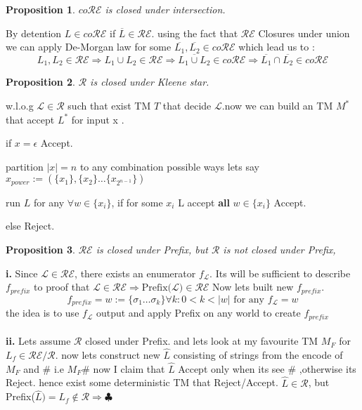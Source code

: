 \documentclass[12pt]{article}
\newtheorem{prop}{Proposition}
\begin{document}
\hrulefill
\begin{prop}  $co\mathcal{RE}$ is closed under intersection.\end{prop}
By detention $L \in co\mathcal{RE}$ if $\overline{L} \in \mathcal{RE}$. using the fact that $\mathcal{RE}$ Closures under union we can apply De-Morgan law  for some $\overline{ L_1},\overline{ L_2}\in co\mathcal{RE} $ which lead us to :  \[ L_1,L_2\in \mathcal{RE} \Rightarrow L_1\cup L_2\in \mathcal{RE}\Rightarrow \overline{ L_1\cup L_2}\in co\mathcal{RE}\Rightarrow \overline{ L_1} \cap \overline{ L_2}\in co\mathcal{RE}\]\hrulefill
\begin{prop}  $\mathcal{R}$ is closed under Kleene star.\end{prop}
w.l.o.g $\mathcal{L} \in \mathcal{R}$ such that exist TM $T$ that decide $\mathcal{L}$.now we can build an TM $M^*$ that accept $L^*$ for input x .
\begin{list}{•}{}
\item if $x=\epsilon$ Accept.
\item  partition $|x|=n$ to any combination possible ways lets say $x_{power}:=( \{x_1\},\{x_2\}\dots \{x_{2^{n-1}}\} )$
\item run $L$ for any $\forall w\in \{ x_i \} $, if for some $x_i$ L accept \textbf{all} $w\in \{ x_i\}$
Accept.
\item else Reject.
\end{list}
\hrulefill
\begin{prop}  $\mathcal{RE}$ is closed under Prefix, but $\mathcal{R}$ is not closed under Prefix,\end{prop}
\textbf{i. }Since $\mathcal{L} \in \mathcal{RE}$, there exists an enumerator $f_{\mathcal{L}}$.  Its will be sufficient to describe $f_{prefix}$ to proof that $\mathcal{L}\in \mathcal{RE}\Rightarrow \text{Prefix(}\mathcal{L})\in \mathcal{RE} $  Now lets built new $f_{prefix}$.
\[f_{prefix}=
    w:=\{ \sigma_1\dots\sigma_k \}  \forall k: 0<k<|w| \text{ for any  }f_{\mathcal{L}}=w
\] 
the idea is to use $f_{\mathcal{L}}$ output and apply Prefix on any world to create $f_{prefix}$\\\\
\textbf{ii. }Lets assume $\mathcal{R}$ closed under Prefix. and lets look at my favourite TM $M_F$  for $L_{f} \in \mathcal{RE/R}$. now lets construct new $\hat{L}$ consisting of strings from the encode of  $M_F$ and $\#$ i.e $M_F\#$
now I claim that $\hat{L}$ Accept only when its see $\#$ ,otherwise its Reject. hence exist some deterministic TM that Reject/Accept. $\hat{L}\in \mathcal{R}$, but Prefix($\hat{L})=L_f\notin \mathcal{R}\Rightarrow \clubsuit$
\end{document}
